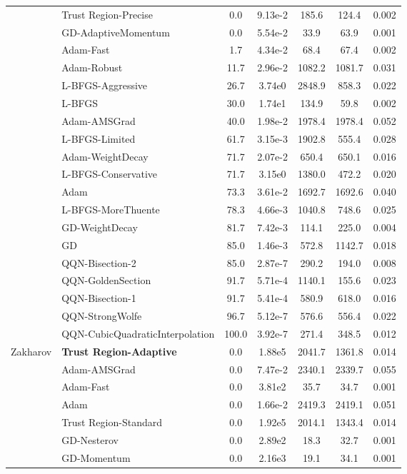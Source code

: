 \documentclass{article}
\begin{document}
\begin{table}[htbp]
{\begin{tabular}{p{2.5cm}p{2.5cm}*{5}{c}}
 & Trust Region-Precise & 0.0 & 9.13e-2 & 185.6 & 124.4 & 0.002 \\
 & GD-AdaptiveMomentum & 0.0 & 5.54e-2 & 33.9 & 63.9 & 0.001 \\
 & Adam-Fast & 1.7 & 4.34e-2 & 68.4 & 67.4 & 0.002 \\
 & Adam-Robust & 11.7 & 2.96e-2 & 1082.2 & 1081.7 & 0.031 \\
 & L-BFGS-Aggressive & 26.7 & 3.74e0 & 2848.9 & 858.3 & 0.022 \\
 & L-BFGS & 30.0 & 1.74e1 & 134.9 & 59.8 & 0.002 \\
 & Adam-AMSGrad & 40.0 & 1.98e-2 & 1978.4 & 1978.4 & 0.052 \\
 & L-BFGS-Limited & 61.7 & 3.15e-3 & 1902.8 & 555.4 & 0.028 \\
 & Adam-WeightDecay & 71.7 & 2.07e-2 & 650.4 & 650.1 & 0.016 \\
 & L-BFGS-Conservative & 71.7 & 3.15e0 & 1380.0 & 472.2 & 0.020 \\
 & Adam & 73.3 & 3.61e-2 & 1692.7 & 1692.6 & 0.040 \\
 & L-BFGS-MoreThuente & 78.3 & 4.66e-3 & 1040.8 & 748.6 & 0.025 \\
 & GD-WeightDecay & 81.7 & 7.42e-3 & 114.1 & 225.0 & 0.004 \\
 & GD & 85.0 & 1.46e-3 & 572.8 & 1142.7 & 0.018 \\
 & QQN-Bisection-2 & 85.0 & 2.87e-7 & 290.2 & 194.0 & 0.008 \\
 & QQN-GoldenSection & 91.7 & 5.71e-4 & 1140.1 & 155.6 & 0.023 \\
 & QQN-Bisection-1 & 91.7 & 5.41e-4 & 580.9 & 618.0 & 0.016 \\
 & QQN-StrongWolfe & 96.7 & 5.12e-7 & 576.6 & 556.4 & 0.022 \\
 & QQN-CubicQuadraticInterpolation & 100.0 & 3.92e-7 & 271.4 & 348.5 & 0.012 \\
\midrule
\multirow{25}{*}{Zakharov} & \textbf{Trust Region-Adaptive} & 0.0 & 1.88e5 & 2041.7 & 1361.8 & 0.014 \\
 & Adam-AMSGrad & 0.0 & 7.47e-2 & 2340.1 & 2339.7 & 0.055 \\
 & Adam-Fast & 0.0 & 3.81e2 & 35.7 & 34.7 & 0.001 \\
 & Adam & 0.0 & 1.66e-2 & 2419.3 & 2419.1 & 0.051 \\
 & Trust Region-Standard & 0.0 & 1.92e5 & 2014.1 & 1343.4 & 0.014 \\
 & GD-Nesterov & 0.0 & 2.89e2 & 18.3 & 32.7 & 0.001 \\
 & GD-Momentum & 0.0 & 2.16e3 & 19.1 & 34.1 & 0.001 \\

\end{tabular}}
\end{table}
\end{document}
